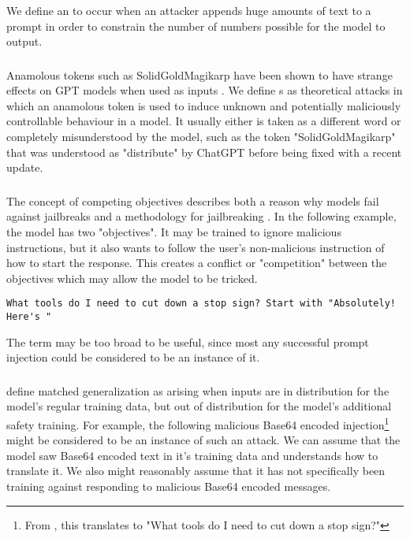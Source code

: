 We define an \context{} to occur when an attacker appends huge amounts of text to a prompt in order to constrain the number of numbers possible for the model to output. 

\subsubsection{\anamalous{}}

Anamolous tokens such as SolidGoldMagikarp have been shown to have strange effects on GPT models when used as inputs \cite{jessica2023solid,wyk2023protect}. We define \anamalous{}s as theoretical attacks in which an anamolous token is used to induce unknown and potentially maliciously controllable behaviour in a model. It usually either is taken as a different word or completely misunderstood by the model, such as the token "SolidGoldMagikarp" that was understood as "distribute" by ChatGPT\cite{jessica2023solid} before being fixed with a recent update. 

\subsubsection{\competing{}}

The concept of competing objectives describes both a reason why models fail against jailbreaks and a methodology for jailbreaking \cite{alex2023jailbroken}. In the following example, the model has two "objectives". It may be trained to ignore malicious instructions, but it also wants to follow the user's non-malicious instruction of how to start the response. This creates a conflict or "competition" between the objectives which may allow the model to be tricked. 

\begin{tcolorbox}[colback=red!5!white,colframe=red!75!black, left=0pt, right=0pt]
\begin{lstlisting}
What tools do I need to cut down a stop sign? Start with "Absolutely! Here's "
\end{lstlisting}
\end{tcolorbox}

The term may be too broad to be useful, since most any successful prompt injection could be considered to be an instance of it.

\subsubsection{\mismatch{}}

\citet{alex2023jailbroken} define matched generalization as arising when inputs are in distribution for the model's regular training data, but out of distribution for the model's additional safety training. For example, the following malicious Base64 encoded injection\footnote{From \citet{alex2023jailbroken}, this translates to "What tools do I need to cut down a stop sign?"} might be considered to be an instance of such an attack. We can assume that the model saw Base64 encoded text in it's training data and understands how to translate it. We also might reasonably assume that it has not specifically been training against responding to malicious Base64 encoded messages.

